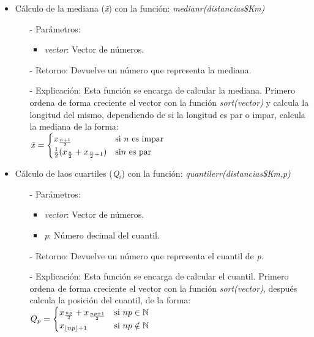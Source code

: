 \documentclass[a4paper, 12pt]{article}
\begin{document}
\begin{itemize}
            \item Cálculo de la mediana (\emph{\~{x}}) con la función: \emph{medianr(distancias\$Km)}
            \begin{itemize}
                \item[-] Parámetros: 
                \begin{itemize}
                    \item \emph{vector}: Vector de números.
                \end{itemize}

                \item[-] Retorno: Devuelve un número que representa la mediana. 

                \item[-] Explicación: Esta función se encarga de calcular la mediana. Primero ordena de forma creciente el vector con la función \emph{sort(vector)} y calcula la longitud del mismo, dependiendo de si la longitud es par o impar, calcula la mediana de la forma: \\
                $\text{\emph{\~{x}}} = \begin{cases} 
                    x_{\frac{n+1}{2}} & \text{si } n \text{ es impar} \\
                    \frac{1}{2}(x_{\frac{n}{2}} + x_{\frac{n}{2}+1}) & \text{si} n \text{ es par}
                \end{cases}$
            \end{itemize}
            
            \item Cálculo de laos cuartiles (\emph{Q$_{i}$}) con la función: \emph{quantilerr(distancias\$Km,p)}
            \begin{itemize}
                \item[-] Parámetros: 
                \begin{itemize}
                    \item \emph{vector}: Vector de números.
                    \item \emph{p}: Número decimal del cuantil.
                \end{itemize}

                \item[-] Retorno: Devuelve un número que representa el cuantil de \emph{p}. 

                \item[-] Explicación: Esta función se encarga de calcular el cuantil. Primero ordena de forma creciente el vector con la función \emph{sort(vector)}, después calcula la posición del cuantil, de la forma: \\
                $\text{\emph{{$Q_{p}$}}} = \begin{cases} 
                    x_{\frac{np}{2}}+x_{\frac{np+1}{2}} & \text{si } np \in \mathbb{N} \\
                    x_{\lfloor{np}\rfloor +1} & \text{si } np \notin \mathbb{N}
                \end{cases}$
            \end{itemize}
        \end{itemize}
    
\end{document}
